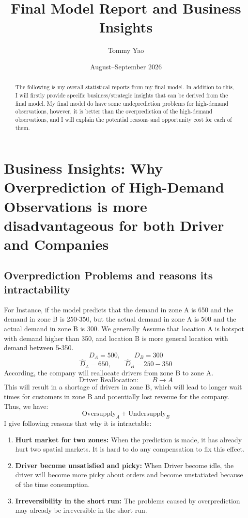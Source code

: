 \documentclass{article}
\title{Final Model Report and Business Insights}
\author{Tommy Yao}
\date{August--September 2026}
\begin{document}
\maketitle

\begin{abstract}
The following is my overall statistical reports from my final model. In addition to this, I will firstly provide
specific business/strategic insights that can be derived from the final model. My final model do have some 
undeprediction problems for high-demand observations, however, it is better than the overprediction of the
high-demand observations, and I will explain the potential reasons and opportunity cost for each of them.
\end{abstract}
\section{Business Insights: Why Overprediction of High-Demand Observations is more disadvantageous for both Driver and Companies}
\subsection{Overprediction Problems and reasons its intractability}
For Instance, if the model predicts that the demand in zone A is 650 and the demand in zone B is 250-350, but the actual demand in zone A is 500 and the actual demand in zone B is 300.
We generally Assume that location A is hotspot with demand higher than 350, and location B is more general location with demand between 5-350.
\[
D_A = 500, \qquad D_B = 300
\]
\[
\hat{D}_A = 650, \qquad \hat{D}_B = 250-350
\]
According, the company
 will reallocate drivers from zone B to zone A. 
\[
\text{Driver Reallocation:} \qquad B \rightarrow A
\]
This will result in a shortage of drivers in zone B, which will lead to longer wait times for customers in zone B and potentially lost revenue for the
company.
Thus, we have:
\[
\text{Oversupply}_A+\text{Undersupply}_B
\]
I give following reasons that why it is intractable:
\begin{enumerate}
    \item \textbf{Hurt market for two zones:}
     When the prediction is made, it has already hurt two spatial markets. 
     It is hard to do any compensation to fix this effect.


    \item \textbf{Driver become unsatisfied and picky:} 
    When Driver become idle, the driver will become more picky about orders 
    and become unstatiated because of the time consumption.


    \item  \textbf{Irreversibility in the short run:}
    The problems caused by overprediction may already be irreversible in the short run.
\end{enumerate}
\end{document}
